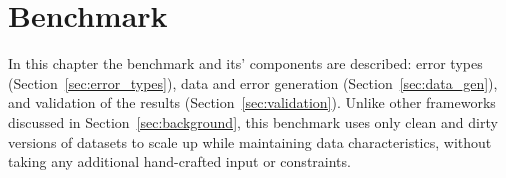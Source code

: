 \chapter{Benchmark}
\label{sec:benchmark}
In this chapter the benchmark and its' components are described: error types (Section~\ref{sec:error_types}), data and error generation (Section~\ref{sec:data_gen}), and validation of the results (Section~\ref{sec:validation}).
Unlike other frameworks discussed in Section~\ref{sec:background}, this benchmark uses only clean and dirty versions of datasets to scale up while maintaining data characteristics, without taking any additional hand-crafted input or constraints.





